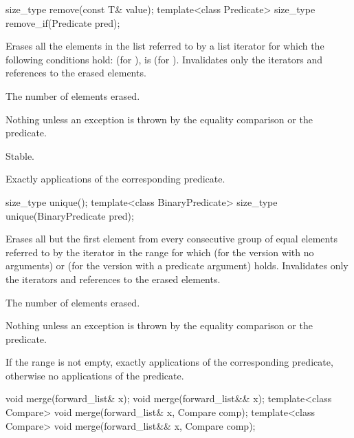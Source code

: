 %
%
\begin{itemdecl}
size_type remove(const T& value);
template<class Predicate> size_type remove_if(Predicate pred);
\end{itemdecl}

\begin{itemdescr}
\pnum
\effects
Erases all the elements in the list referred to by a list iterator  for
which the following conditions hold:  (for ),
 is  (for ).
Invalidates only the iterators and references to the erased elements.

\pnum
\returns
The number of elements erased.

\pnum
\throws
Nothing unless an exception is thrown by the equality comparison or the
predicate.

\pnum
\remarks
Stable.

\pnum
\complexity
Exactly  applications of the corresponding
predicate.
\end{itemdescr}

%
\begin{itemdecl}
size_type unique();
template<class BinaryPredicate> size_type unique(BinaryPredicate pred);
\end{itemdecl}

\begin{itemdescr}
\pnum
\effects
Erases all but the first element from every consecutive
group of equal elements referred to by the iterator  in the range  for which  (for the version with no arguments) or  (for the version with a predicate argument) holds.
Invalidates only the iterators and references to the erased elements.

\pnum
\returns
The number of elements erased.

\pnum
\throws
Nothing unless an exception is thrown by the equality comparison or the predicate.

\pnum
\complexity
If the range  is not empty, exactly  applications of the corresponding predicate, otherwise no applications of the predicate.
\end{itemdescr}

%
\begin{itemdecl}
void merge(forward_list& x);
void merge(forward_list&& x);
template<class Compare> void merge(forward_list& x, Compare comp);
template<class Compare> void merge(forward_list&& x, Compare comp);
\end{itemdecl}

